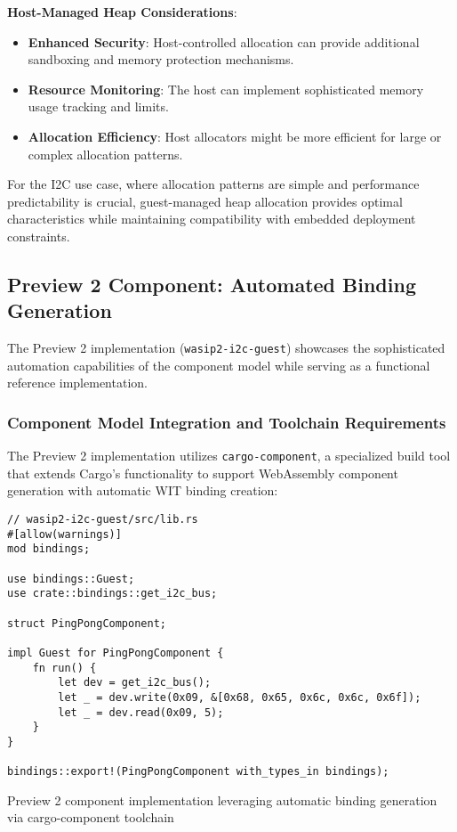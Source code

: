 \textbf{Host-Managed Heap Considerations}:
\begin{itemize}
    \item \textbf{Enhanced Security}: Host-controlled allocation can provide additional sandboxing and memory protection mechanisms.
    \item \textbf{Resource Monitoring}: The host can implement sophisticated memory usage tracking and limits.
    \item \textbf{Allocation Efficiency}: Host allocators might be more efficient for large or complex allocation patterns.
\end{itemize}

For the I2C use case, where allocation patterns are simple and performance predictability is crucial, guest-managed heap allocation provides optimal characteristics while maintaining compatibility with embedded deployment constraints.

\subsection{Preview 2 Component: Automated Binding Generation}

The Preview 2 implementation (\texttt{wasip2-i2c-guest}) showcases the sophisticated automation capabilities of the component model while serving as a functional reference implementation.

\subsubsection{Component Model Integration and Toolchain Requirements}

The Preview 2 implementation utilizes \texttt{cargo-component}, a specialized build tool that extends Cargo's functionality to support WebAssembly component generation with automatic WIT binding creation:

\begin{listing}[H]
\begin{verbatim}
// wasip2-i2c-guest/src/lib.rs
#[allow(warnings)]
mod bindings;

use bindings::Guest;
use crate::bindings::get_i2c_bus;

struct PingPongComponent;

impl Guest for PingPongComponent {
    fn run() {
        let dev = get_i2c_bus();
        let _ = dev.write(0x09, &[0x68, 0x65, 0x6c, 0x6c, 0x6f]);
        let _ = dev.read(0x09, 5);
    }
}

bindings::export!(PingPongComponent with_types_in bindings);
\end{verbatim}
\caption{Preview 2 component implementation leveraging automatic binding generation via cargo-component toolchain}
\label{lst:preview2-guest}
\end{listing}


